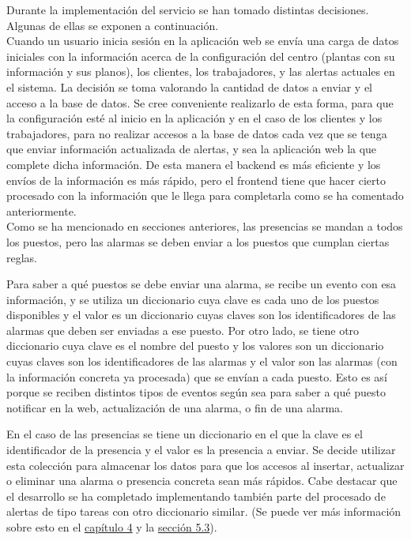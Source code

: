 Durante la implementación del servicio se han tomado distintas decisiones. Algunas de ellas se exponen a continuación.\\

Cuando un usuario inicia sesión en la aplicación web se envía una carga de datos iniciales con la información acerca de la configuración del centro (plantas con su información y sus planos), los clientes, los trabajadores, y las alertas actuales en el sistema. La decisión se toma valorando la cantidad de datos a enviar y el acceso a la base de datos. Se cree conveniente realizarlo de esta forma, para que la configuración esté al inicio en la aplicación y en el caso de los clientes y los trabajadores, para no realizar accesos a la base de datos cada vez que se tenga que enviar información actualizada de alertas, y sea la aplicación web la que complete dicha información. De esta manera el backend es más eficiente y los envíos de la información es más rápido, pero el frontend tiene que hacer cierto procesado con la información que le llega para completarla como se ha comentado anteriormente.\\

Como se ha mencionado en secciones anteriores, las presencias se mandan a todos los puestos, pero las alarmas se deben enviar a los puestos que cumplan ciertas reglas.

Para saber a qué puestos se debe enviar una alarma, se recibe un evento con esa información, y se utiliza un diccionario cuya clave es cada uno de los puestos disponibles y el valor es un diccionario cuyas claves son los identificadores de las alarmas que deben ser enviadas a ese puesto. Por otro lado, se tiene otro diccionario cuya clave es el nombre del puesto y los valores son un diccionario cuyas claves son los identificadores de las alarmas y el valor son las alarmas (con la información concreta ya procesada) que se envían a cada puesto. Esto es así porque se reciben distintos tipos de eventos según sea para saber a qué puesto notificar en la web, actualización de una alarma, o fin de una alarma.

En el caso de las presencias se tiene un diccionario en el que la clave es el identificador de la presencia y el valor es la presencia a enviar.
Se decide utilizar esta colección para almacenar los datos para que los accesos al insertar, actualizar o eliminar una alarma o presencia concreta sean más rápidos.
Cabe destacar que el desarrollo se ha completado implementando también parte del procesado de alertas de tipo tareas con otro diccionario similar. (Se puede ver más información sobre esto en el \hyperref[section-gestion-proyecto]{capítulo 4} y la \hyperref[section-trabajo-futuro]{sección 5.3}).\\

